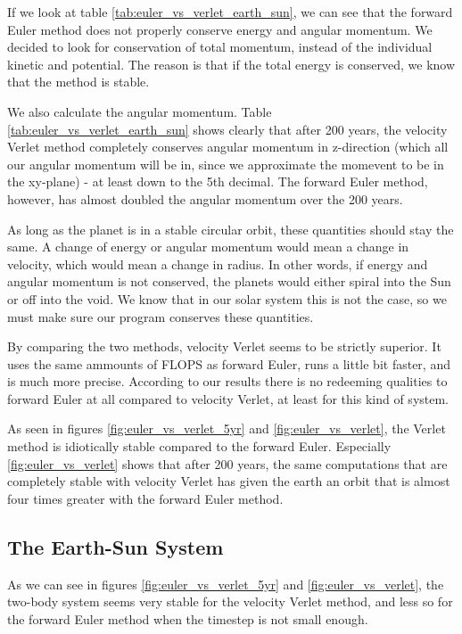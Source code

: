 \documentclass[10pt,showpacs,preprintnumbers,footinbib,amsmath,amssymb,aps,prl,twocolumn,groupedaddress,superscriptaddress,showkeys]{revtex4-1}
\begin{document}
If we look at table \ref{tab:euler_vs_verlet_earth_sun}, we can see that the forward Euler method does not properly conserve energy and angular momentum. We decided to look for conservation of total momentum, instead of the individual kinetic and potential. The reason is that if the total energy is conserved, we know that the method is stable.

We also calculate the angular momentum. Table \ref{tab:euler_vs_verlet_earth_sun} shows clearly that after 200 years, the velocity Verlet method completely conserves angular momentum in z-direction (which all our angular momentum will be in, since we approximate the momevent to be in the xy-plane) - at least down to the 5th decimal. The forward Euler method, however, has almost doubled the angular momentum over the 200 years.

As long as the planet is in a stable circular orbit, these quantities should stay the same. A change of energy or angular momentum would mean a change in velocity, which would mean a change in radius. In other words, if energy and angular momentum is not conserved, the planets would either spiral into the Sun or off into the void. We know that in our solar system this is not the case, so we must make sure our program conserves these quantities.

By comparing the two methods, velocity Verlet seems to be strictly superior. It uses the same ammounts of FLOPS as forward Euler, runs a little bit faster, and is much more precise. According to our results there is no redeeming qualities to forward Euler at all compared to velocity Verlet, at least for this kind of system.

As seen in figures \ref{fig:euler_vs_verlet_5yr} and \ref{fig:euler_vs_verlet}, the Verlet method is idiotically stable compared to the forward Euler. Especially \ref{fig:euler_vs_verlet} shows that after 200 years, the same computations that are completely stable with velocity Verlet has given the earth an orbit that is almost four times greater with the forward Euler method.

\subsection{The Earth-Sun System}

As we can see in figures \ref{fig:euler_vs_verlet_5yr} and \ref{fig:euler_vs_verlet}, the two-body system seems very stable for the velocity Verlet method, and less so for the forward Euler method when the timestep is not small enough.
\end{document}
